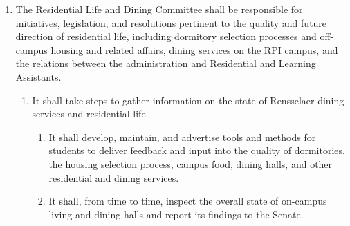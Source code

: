 \begin{enumerate}
\begin{enumerate}
  \item It shall take steps to gather information on the state of services and facilities.
    \begin{enumerate}
    \item To this end, it shall coordinate with the Senate Communications and Engagement Committee during outreach programs to ascertain student opinions and concerns on the state of services and facilities.
    \item It shall, when necessary, address these concerns and coordinate its efforts with proper Institute personnel.
    \item It shall, from time to time, inspect the overall state of facilities and services and report its findings to the Senate.
    \end{enumerate}
  \item It shall take steps to remedy student concerns regarding facilities and services.
    \begin{enumerate}
    \item To this end, it shall be responsible for contacting proper Institute personnel to discuss practical solutions to issues regarding facilities and services.
    \item It shall attempt to implement these solutions, with the support of the Institute and the Senate.
    \end{enumerate}
  \end{enumerate}
\item The Residential Life and Dining Committee shall be responsible for initiatives, legislation, and resolutions pertinent to the quality and future direction of residential life, including dormitory selection processes and off-campus housing and related affairs, dining services on the RPI campus, and the relations between the administration and Residential and Learning Assistants.
  \begin{enumerate}
  \item It shall take steps to gather information on the state of Rensselaer dining services and residential life.
    \begin{enumerate}
    \item It shall develop, maintain, and advertise tools and methods for students to deliver feedback and input into the quality of dormitories, the housing selection process, campus food, dining halls, and other residential and dining services.
    \item It shall, from time to time, inspect the overall state of on-campus living and dining halls and report its findings to the Senate.

\end{enumerate}
\end{enumerate}
\end{enumerate}
